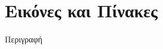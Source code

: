 \documentclass{beamer}
\begin{document}
\section{Εικόνες και Πίνακες}

\begin{frame}{Περιγραφή}
\begin{multicols}{2}
\tableofcontents[currentsection]
\end{multicols}
\end{frame}

\end{document}

